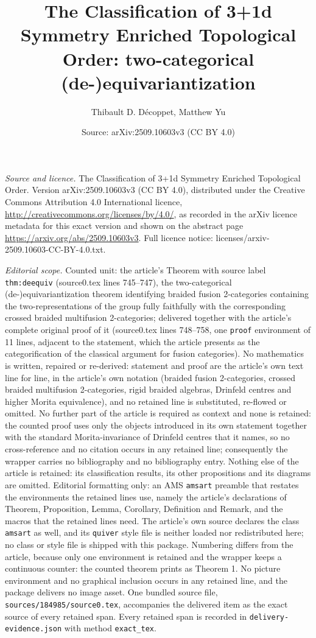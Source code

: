\documentclass[10pt,a4paper]{amsart}
\title[3+1d symmetry enriched topological order]{The Classification of 3+1d Symmetry Enriched Topological Order: two-categorical (de-)equivariantization}
\author{Thibault D. Décoppet, Matthew Yu}
\date{Source: arXiv:2509.10603v3 (CC BY 4.0)}
\theoremstyle{plain}
\theoremstyle{definition}
\theoremstyle{remark}
\begin{document}
\maketitle
\noindent\emph{Source and licence.} The Classification of 3+1d Symmetry Enriched Topological Order. Version arXiv:2509.10603v3 (CC BY 4.0), distributed under the Creative Commons Attribution 4.0 International licence, \url{http://creativecommons.org/licenses/by/4.0/}, as recorded in the arXiv licence metadata for this exact version and shown on the abstract page \url{https://arxiv.org/abs/2509.10603v3}. Full licence notice: licenses/arxiv-2509.10603-CC-BY-4.0.txt.\par\smallskip

\noindent\textit{Editorial scope.} Counted unit: the article's Theorem with source label \texttt{thm:deequiv} (source0.tex lines 745--747), the two-categorical (de-)equivariantization theorem identifying braided fusion 2-categories containing the two-representations of the group fully faithfully with the corresponding crossed braided multifusion 2-categories; delivered together with the article's complete original proof of it (source0.tex lines 748--758, one \texttt{proof} environment of 11 lines, adjacent to the statement, which the article presents as the categorification of the classical argument for fusion categories). No mathematics is written, repaired or re-derived: statement and proof are the article's own text line for line, in the article's own notation (braided fusion 2-categories, crossed braided multifusion 2-categories, rigid braided algebras, Drinfeld centres and higher Morita equivalence), and no retained line is substituted, re-flowed or omitted. No further part of the article is required as context and none is retained: the counted proof uses only the objects introduced in its own statement together with the standard Morita-invariance of Drinfeld centres that it names, so no cross-reference and no citation occurs in any retained line; consequently the wrapper carries no bibliography and no bibliography entry. Nothing else of the article is retained: its classification results, its other propositions and its diagrams are omitted. Editorial formatting only: an AMS \texttt{amsart} preamble that restates the environments the retained lines use, namely the article's declarations of Theorem, Proposition, Lemma, Corollary, Definition and Remark, and the macros that the retained lines need. The article's own source declares the class \texttt{amsart} as well, and its \texttt{quiver} style file is neither loaded nor redistributed here; no class or style file is shipped with this package. Numbering differs from the article, because only one environment is retained and the wrapper keeps a continuous counter: the counted theorem prints as Theorem 1. No picture environment and no graphical inclusion occurs in any retained line, and the package delivers no image asset. One bundled source file, \texttt{sources/184985/source0.tex}, accompanies the delivered item as the exact source of every retained span. Every retained span is recorded in \texttt{delivery-evidence.json} with method \texttt{exact\_tex}.
\end{document}
